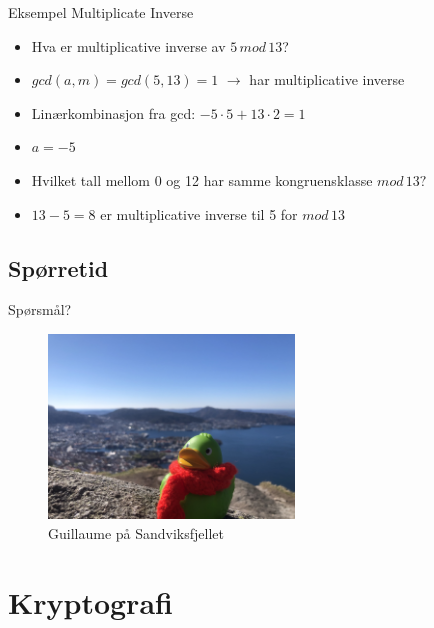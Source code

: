 \begin{frame}{Eksempel Multiplicate Inverse}
\begin{itemize}[<+->]
\item Hva er multiplicative inverse av $5\, mod\, 13$?
\item $gcd(a,m) = gcd(5,13)=1$ $\rightarrow$ har multiplicative inverse
\item Linærkombinasjon fra gcd: $-5\cdot 5+13\cdot 2=1$
\item $a = -5$
\item Hvilket tall mellom 0 og 12 har samme kongruensklasse $mod\, 13?$ 
\item $13-5=8$ er multiplicative inverse til 5 for $mod\, 13$
\end{itemize}
\end{frame}

\subsection*{Spørretid}
\begin{frame}{Spørsmål?}
    \begin{figure}
        \centering
        \includegraphics[height = 4.9cm]{images/guillaume1.jpg}
        \caption{Guillaume på Sandviksfjellet}
        \label{fig:guillaume1}
    \end{figure}
\end{frame}


\section{Kryptografi}
